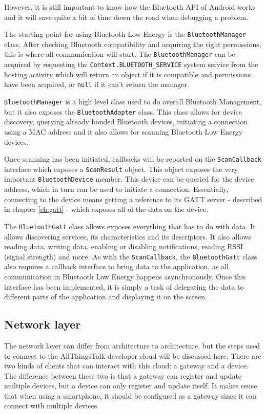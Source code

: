 \documentclass[pdftex,a4paper,12pt,twoside]{report}
\begin{document}
However, it is still important to know how the Bluetooth API of Android works and it will save quite a bit of time down the road when debugging a problem.

The starting point for using Bluetooth Low Energy is the \texttt{BluetoothManager} class. After checking Bluetooth compatibility and acquiring the right permissions, this is where all communication will start. The \texttt{BluetoothManager} can be acquired by requesting the \texttt{Context.BLUETOOTH\_SERVICE} system service from the hosting activity which will return an object if it is compatible and permissions have been acquired, or \texttt{null} if it can't return the manager.

\texttt{BluetoothManager} is a high level class used to do overall Bluetooth Management, but it also exposes the \texttt{BluetoothAdapter} class. This class allows for device discovery, querying already bonded Bluetooth devices, initiating a connection using a MAC address and it also allows for scanning Bluetooth Low Energy devices.

Once scanning has been initiated, callbacks will be reported on the \texttt{ScanCallback} interface which exposes a \texttt{ScanResult} object. This object exposes the very important \texttt{BluetoothDevice} member. This device can be queried for the device address, which in turn can be used to initiate a connection. Essentially, connecting to the device means getting a reference to its GATT server - described in chapter \ref{ch:gatt} - which exposes all of the data on the device.

The \texttt{BluetoothGatt} class allows exposes everything that has to do with data. It allows discovering services, its characteristics and its descriptors. It also allows reading data, writing data, enabling or disabling notifications, reading RSSI (signal strength) and more. As with the \texttt{ScanCallback}, the \texttt{BluetoothGatt} class also requires a callback interface to bring data to the application, as all communication in Bluetooth Low Energy happens asynchronously. Once this interface has been implemented, it is simply a task of delegating the data to different parts of the application and displaying it on the screen.

\subsection{Network layer}
\label{subsec:networklayer}
The network layer can differ from architecture to architecture, but the steps used to connect to the AllThingsTalk developer cloud will be discussed here. There are two kinds of clients that can interact with this cloud: a gateway and a device. The difference between these two is that a gateway can register and update multiple devices, but a device can only register and update itself. It makes sense that when using a smartphone, it should be configured as a gateway since it can connect with multiple devices.
\end{document}
